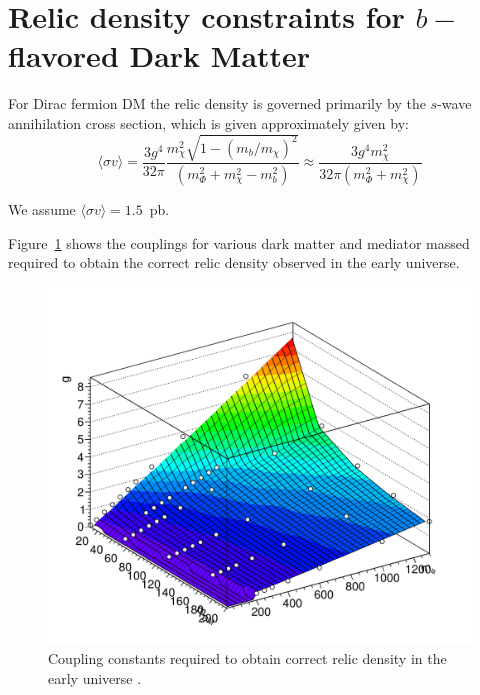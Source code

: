 \section{\texorpdfstring{Relic density constraints for $b-$flavored Dark Matter}{Relic density constraints for b-flavored Dark Matter}}
\label{app:Relic_Density_bFDM}
\label{app:xsecs_bFDM}

For Dirac fermion DM the relic density is governed primarily by the $s$-wave annihilation cross section, which is given approximately given by:
\begin{equation}
\langle \sigma v \rangle = \frac{3g^4}{32\pi} \frac{m^2_\chi \sqrt{1-(m_b/m_\chi)^2}}{\left( m^2_\Phi+m^2_\chi-m^2_b \right)} \approx \frac{3g^4 m^2_\chi}{32\pi (m^2_\Phi+m^2_\chi)}
\end{equation}

We assume $ \langle \sigma v \rangle=1.5$~pb. 


Figure~\ref{fig:relic_weights} shows the couplings for various dark matter and mediator massed required to obtain the correct relic density observed in the early universe.

\begin{figure}[h!]
	\centering 
	\includegraphics[scale=0.5]{figures/bFDM/relic_weights}
	\caption{Coupling constants required to obtain correct relic density in the early universe . \label{fig:relic_weights}}
	\end{figure}	

